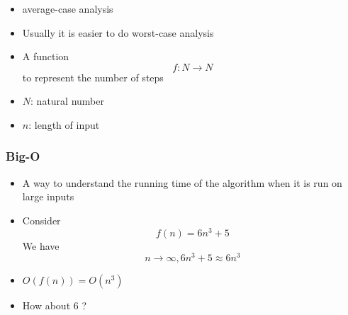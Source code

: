 \begin{frame}[allowframebreaks]
\begin{itemize}
\item average-case analysis
\item Usually it is easier to do worst-case analysis
\item A function
  \begin{equation*}
  f: N \rightarrow N
\end{equation*}
to represent the number of steps
\item [] $N$: natural number

\item [] $n$: length of input

\end{itemize}\end{frame} \begin{frame}[allowframebreaks] \frametitle{Big-O}
  \begin{itemize}
  \item
A way to understand the running time of the algorithm when
it is run on large inputs
\item Consider
  \begin{equation*}
  f(n)=6n^3 + 5
\end{equation*}
  We have
  \begin{equation*}
n \rightarrow \infty, 6n^3 + 5 \approx 6n^3
\end{equation*}
\item $O(f(n))=O(n^3)$

\item [] How about 6 ?


\end{itemize}
\end{frame}
